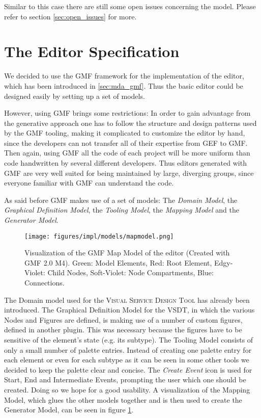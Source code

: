 Similar to this case there are still some open issues concerning the model. Please refer to section \ref{sec:open_issues} for more.



\section{The Editor Specification}

We decided to use the GMF framework for the implementation of the editor, which has been introduced in \ref{sec:mda_gmf}. Thus the basic editor could be designed easily by setting up a set of models.

However, using GMF brings some restrictions: In order to gain advantage from the generative approach one has to follow the structure and design patterns used by the GMF tooling, making it complicated to customize the editor by hand, since the developers can not transfer all of their expertise from GEF to GMF. Then again, using GMF all the code of each project will be more uniform than code handwritten by several different developers. Thus editors generated with GMF are very well suited for being maintained by large, diverging groups, since everyone familiar with GMF can understand the code.

As said before GMF makes use of a set of models: The \emph{Domain Model}, the \emph{Graphical Definition Model}, the \emph{Tooling Model}, the \emph{Mapping Model} and the \emph{Generator Model}.

\begin{figure}[ht]
	\centering
	\texttt{[image: figures/impl/models/mapmodel.png]}
	\caption[VSDT Map Model]{Visualization of the GMF Map Model of the editor (Created with GMF 2.0 M4). Green: Model Elements, Red: Root Element, Edgy-Violet: Child Nodes, Soft-Violet: Node Compartments, Blue: Connections.}
	\label{fig:mapmodel}
\end{figure}

The Domain model used for the \textsc{Visual Service Design Tool} has already been introduced. The Graphical Definition Model for the VSDT, in which the various Nodes and Figures are defined, is making use of a number of custom figures, defined in another plugin. This was necessary because the figures have to be sensitive of the element's state (e.g. its subtype). The Tooling Model consists of only a small number of palette entries. Instead of creating one palette entry for each element or even for each subtype as it can be seen in some other tools we decided to keep the palette clear and concise. The \emph{Create Event} icon is used for Start, End and Intermediate Events, prompting the user which one should be created. Doing so we hope for a good usability. A visualization of the Mapping Model, which glues the other models together and is then used to create the Generator Model, can be seen in figure \ref{fig:mapmodel}.

